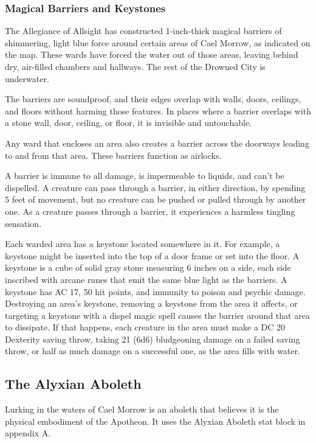 \documentclass[10pt,a4paper,twoside,bg=print,twocolumn,openany,nodeprecatedcode]{dndbook}
\begin{document}
\subsubsection{Magical Barriers and Keystones}
The Allegiance of Allsight has constructed 1-inch-thick magical barriers of shimmering, light blue force around certain areas of Cael Morrow, as indicated on the map. These wards have forced the water out of those areas, leaving behind dry, air-filled chambers and hallways. The rest of the Drowned City is underwater.

The barriers are soundproof, and their edges overlap with walls, doors, ceilings, and floors without harming those features. In places where a barrier overlaps with a stone wall, door, ceiling, or floor, it is invisible and untouchable.

Any ward that encloses an area also creates a barrier across the doorways leading to and from that area. These barriers function as airlocks.

A barrier is immune to all damage, is impermeable to liquids, and can't be dispelled. A creature can pass through a barrier, in either direction, by spending 5 feet of movement, but no creature can be pushed or pulled through by another one. As a creature passes through a barrier, it experiences a harmless tingling sensation.

Each warded area has a keystone located somewhere in it. For example, a keystone might be inserted into the top of a door frame or set into the floor. A keystone is a cube of solid gray stone measuring 6 inches on a side, each side inscribed with arcane runes that emit the same blue light as the barriers. A keystone has AC 17, 50 hit points, and immunity to poison and psychic damage. Destroying an area's keystone, removing a keystone from the area it affects, or targeting a keystone with a dispel magic spell causes the barrier around that area to dissipate. If that happens, each creature in the area must make a DC 20 Dexterity saving throw, taking 21 (6d6) bludgeoning damage on a failed saving throw, or half as much damage on a successful one, as the area fills with water.

\subsection{The Alyxian Aboleth}
Lurking in the waters of Cael Morrow is an aboleth that believes it is the physical embodiment of the Apotheon. It uses the Alyxian Aboleth stat block in appendix A.
\end{document}
